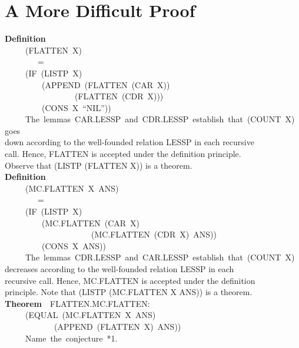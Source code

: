 \documentclass[10pt]{book}
\newenvironment{pubasis}{\begin{flushleft}}{\end{flushleft}}
\newcommand{\axiomordefinition}[1]{\vspace{6pt}\Large\textsf{\textbf{#1}}\normalsize}
\begin{document}
\section{A More Difficult Proof}
\begin{pubasis}
\axiomordefinition{Definition}\\
~~~~~(FLATTEN~X)\\
~~~~~~~~=\\
~~~~~(IF~(LISTP~X)\\
~~~~~~~~~(APPEND~(FLATTEN~(CAR~X))\\
~~~~~~~~~~~~~~~~~(FLATTEN~(CDR~X)))\\
~~~~~~~~~(CONS~X~``NIL''))\\

~~~~~The~lemmas~CAR.LESSP~and~CDR.LESSP~establish~that~(COUNT~X)~goes\\
down according to the well-founded relation LESSP in each recursive\\
call.  Hence, FLATTEN is accepted under the definition principle.\\
Observe that (LISTP (FLATTEN X)) is a theorem.\\

\axiomordefinition{Definition}\\
~~~~~(MC.FLATTEN~X~ANS)\\
~~~~~~~~=\\
~~~~~(IF~(LISTP~X)\\
~~~~~~~~~(MC.FLATTEN~(CAR~X)\\
~~~~~~~~~~~~~~~~~~~~~(MC.FLATTEN~(CDR~X)~ANS))\\
~~~~~~~~~(CONS~X~ANS))\\

~~~~~The~lemmas~CDR.LESSP~and~CAR.LESSP~establish~that~(COUNT~X)\\
decreases according to the well-founded relation LESSP in each\\
recursive call.  Hence, MC.FLATTEN is accepted under the definition\\
principle.  Note that (LISTP (MC.FLATTEN X ANS)) is a theorem.\\

\axiomordefinition{Theorem}~~FLATTEN.MC.FLATTEN:\\
~~~~~(EQUAL~(MC.FLATTEN~X~ANS)\\
~~~~~~~~~~~~(APPEND~(FLATTEN~X)~ANS))\\

~~~~~Name~the~conjecture~*1.\\


\end{pubasis}
\end{document}
